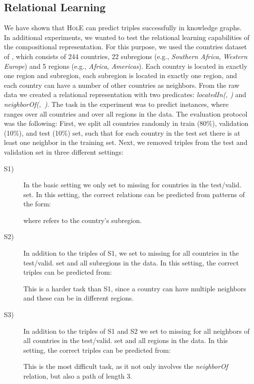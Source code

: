\documentclass[letterpaper]{article}
\newcommand{\hole}{\textsc{HolE}\xspace}
\begin{document}
\subsection{Relational Learning}
We have shown that \hole can predict triples successfully in knowledge
graphs. In additional experiments, we wanted to test the relational learning
capabilities of the compositional representation. For this purpose, we used the
countries dataset of \citet{bouchard2015approximate}, which consists of 244
countries, 22 subregions (e.g., \textit{Southern Africa}, \textit{Western
  Europe}) and 5 regions (e.g., \textit{Africa}, \textit{Americas}). 
Each country is located in exactly one region and subregion, each subregion is
located in exactly one region, and each country can have a number of other
countries as neighbors. From the raw data we created a relational representation
with two predicates: \textit{locatedIn(, )} and
\mbox{\textit{neighborOf(, )}}.
The task in the experiment was to predict  instances,
where  ranges over all countries and  over all regions in the data.
The evaluation protocol was the following: First, we split all countries randomly in
train (80\%), validation (10\%), and test (10\%) set, such that for each country
in the test set there is at least one neighbor in the training set.
Next, we removed triples from the test and validation set
in three different settings:
\begin{description}
\item[S1)] In the basic setting we only set  to missing for
  countries in the test/valid. set. In this
  setting, the correct relations can be predicted from patterns of the form:
  
  where  refers to the country's subregion.
\item[S2)] In addition to the triples of S1, we set
   to missing for all
  countries  in the test/valid. set and all subregions  in the data. 
  In this setting, the correct triples can be predicted from:
  
  This is a harder task than S1, since a country can have multiple
  neighbors and these can be in different regions.
\item[S3)] In addition to the triples of S1 and S2 we set
   to missing for all neighbors  of all countries in the test/valid. set
  and all regions  in the data. In this setting, the correct
  triples can be predicted from: 
  
  This is the most difficult task, as it not only involves the
  \textit{neighborOf} relation, but also a path of length 3.
\end{description}
\end{document}

